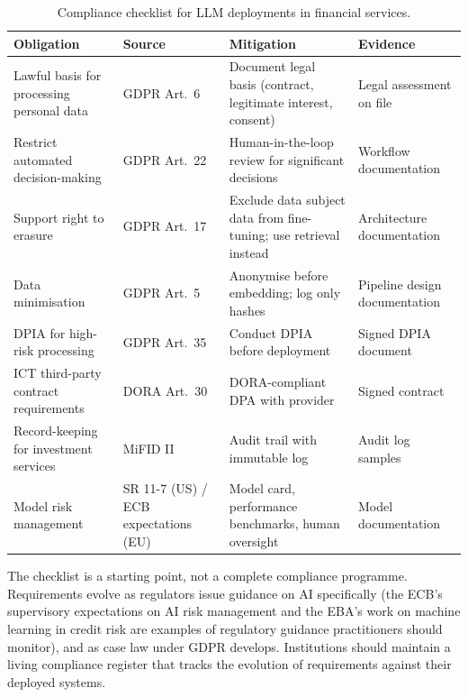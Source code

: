 \begin{table}[h]
\caption{Compliance checklist for LLM deployments in financial services.}
\label{tab:ch15-compliance}
\begin{center}
\begin{tabular}{p{3.5cm}p{2.5cm}p{3cm}p{3.5cm}}
\toprule
\textbf{Obligation} & \textbf{Source} & \textbf{Mitigation} & \textbf{Evidence} \\
\midrule
Lawful basis for processing personal data & GDPR Art.\ 6 & Document legal basis (contract, legitimate interest, consent) & Legal assessment on file \\
\addlinespace
Restrict automated decision-making & GDPR Art.\ 22 & Human-in-the-loop review for significant decisions & Workflow documentation \\
\addlinespace
Support right to erasure & GDPR Art.\ 17 & Exclude data subject data from fine-tuning; use retrieval instead & Architecture documentation \\
\addlinespace
Data minimisation & GDPR Art.\ 5 & Anonymise before embedding; log only hashes & Pipeline design documentation \\
\addlinespace
DPIA for high-risk processing & GDPR Art.\ 35 & Conduct DPIA before deployment & Signed DPIA document \\
\addlinespace
ICT third-party contract requirements & DORA Art.\ 30 & DORA-compliant DPA with provider & Signed contract \\
\addlinespace
Record-keeping for investment services & MiFID II & Audit trail with immutable log & Audit log samples \\
\addlinespace
Model risk management & SR 11-7 (US) / ECB expectations (EU) & Model card, performance benchmarks, human oversight & Model documentation \\
\bottomrule
\end{tabular}
\end{center}
\end{table}

The checklist is a starting point, not a complete compliance programme. Requirements evolve as regulators issue guidance on AI specifically (the ECB's supervisory expectations on AI risk management and the EBA's work on machine learning in credit risk are examples of regulatory guidance practitioners should monitor), and as case law under GDPR develops. Institutions should maintain a living compliance register that tracks the evolution of requirements against their deployed systems.

